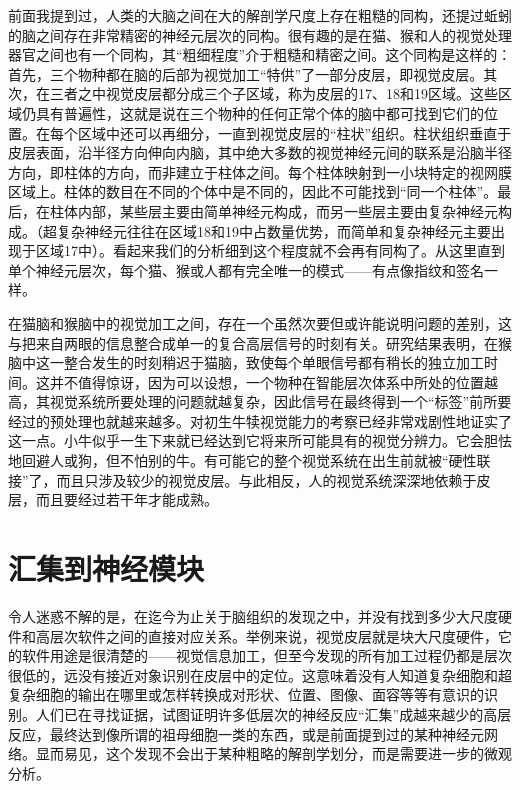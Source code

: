 前面我提到过，人类的大脑之间在大的解剖学尺度上存在粗糙的同构，还提过蚯蚓的脑之间存在非常精密的神经元层次的同构。很有趣的是在猫、猴和人的视觉处理器官之间也有一个同构，其“粗细程度”介于粗糙和精密之间。这个同构是这样的：首先，三个物种都在脑的后部为视觉加工“特供”了一部分皮层，即视觉皮层。其次，在三者之中视觉皮层都分成三个子区域，称为皮层的17、18和19区域。这些区域仍具有普遍性，这就是说在三个物种的任何正常个体的脑中都可找到它们的位置。在每个区域中还可以再细分，一直到视觉皮层的“柱状”组织。柱状组织垂直于皮层表面，沿半径方向伸向内脑，其中绝大多数的视觉神经元间的联系是沿脑半径方向，即柱体的方向，而非建立于柱体之间。每个柱体映射到一小块特定的视网膜区域上。柱体的数目在不同的个体中是不同的，因此不可能找到“同一个柱体”。最后，在柱体内部，某些层主要由简单神经元构成，而另一些层主要由复杂神经元构成。（超复杂神经元往往在区域18和19中占数量优势，而简单和复杂神经元主要出现于区域17中）。看起来我们的分析细到这个程度就不会再有同构了。从这里直到单个神经元层次，每个猫、猴或人都有完全唯一的模式——有点像指纹和签名一样。

在猫脑和猴脑中的视觉加工之间，存在一个虽然次要但或许能说明问题的差别，这与把来自两眼的信息整合成单一的复合高层信号的时刻有关。研究结果表明，在猴脑中这一整合发生的时刻稍迟于猫脑，致使每个单眼信号都有稍长的独立加工时间。这并不值得惊讶，因为可以设想，一个物种在智能层次体系中所处的位置越高，其视觉系统所要处理的问题就越复杂，因此信号在最终得到一个“标签”前所要经过的预处理也就越来越多。对初生牛犊视觉能力的考察已经非常戏剧性地证实了这一点。小牛似乎一生下来就已经达到它将来所可能具有的视觉分辨力。它会胆怯地回避人或狗，但不怕别的牛。有可能它的整个视觉系统在出生前就被“硬性联接”了，而且只涉及较少的视觉皮层。与此相反，人的视觉系统深深地依赖于皮层，而且要经过若干年才能成熟。

\section{汇集到神经模块}

令人迷惑不解的是，在迄今为止关于脑组织的发现之中，并没有找到多少大尺度硬件和高层次软件之间的直接对应关系。举例来说，视觉皮层就是块大尺度硬件，它的软件用途是很清楚的——视觉信息加工，但至今发现的所有加工过程仍都是层次很低的，远没有接近对象识别在皮层中的定位。这意味着没有人知道复杂细胞和超复杂细胞的输出在哪里或怎样转换成对形状、位置、图像、面容等等有意识的识别。人们已在寻找证据，试图证明许多低层次的神经反应“汇集”成越来越少的高层反应，最终达到像所谓的祖母细胞一类的东西，或是前面提到过的某种神经元网络。显而易见，这个发现不会出于某种粗略的解剖学划分，而是需要进一步的微观分析。

